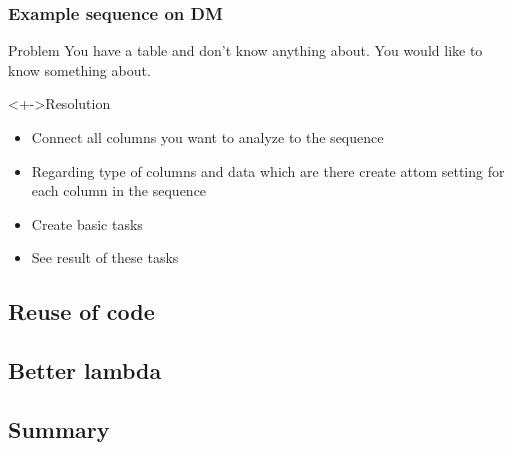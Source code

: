 \documentclass{beamer}
\begin{document}
\begin{frame}
	\frametitle{Example sequence on DM}
	\begin{block}{Problem}
		You have a table and don't know anything about.
		You would like to know something about.
	\end{block}
	\begin{block}<+->{Resolution}
		\begin{itemize}[<+->]
			\item Connect all columns you want to analyze to the sequence
			\item Regarding type of columns and data which are there create attom setting for each column in the sequence
			\item Create basic tasks
			\item See result of these tasks
		\end{itemize}		
	\end{block}
\end{frame}

\subsection{Reuse of code}

\subsection{Better lambda}

\subsection{Summary}
\end{document}
